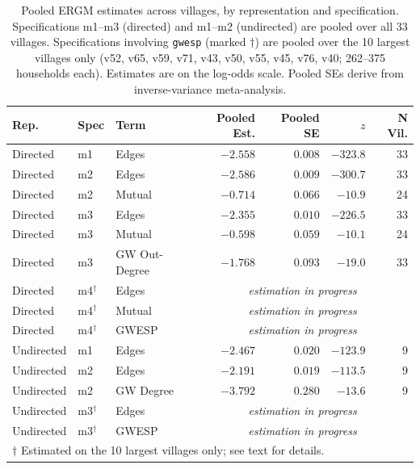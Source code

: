 \documentclass[11pt,a4paper]{article}
\begin{document}
\begin{table}[H]
\centering
\caption{Pooled ERGM estimates across villages, by representation and specification. Specifications m1--m3 (directed) and m1--m2 (undirected) are pooled over all 33 villages. Specifications involving \texttt{gwesp} (marked $\dagger$) are pooled over the 10 largest villages only (v52, v65, v59, v71, v43, v50, v55, v45, v76, v40; 262--375 households each). Estimates are on the log-odds scale. Pooled SEs derive from inverse-variance meta-analysis.}
\label{tab:ergm_pooled}
\begin{tabular}{lllrrrr}
\toprule
Rep. & Spec & Term & Pooled Est. & Pooled SE & $z$ & N Vil. \\
\midrule
Directed & m1 & Edges          & $-2.558$ & $0.008$ & $-323.8$ & 33 \\
Directed & m2 & Edges          & $-2.586$ & $0.009$ & $-300.7$ & 33 \\
Directed & m2 & Mutual         & $-0.714$ & $0.066$ & $-10.9$  & 24 \\
Directed & m3 & Edges          & $-2.355$ & $0.010$ & $-226.5$ & 33 \\
Directed & m3 & Mutual         & $-0.598$ & $0.059$ & $-10.1$  & 24 \\
Directed & m3 & GW Out-Degree  & $-1.768$ & $0.093$ & $-19.0$  & 33 \\
Directed & m4$^\dagger$ & Edges  & \multicolumn{4}{c}{\textit{estimation in progress}} \\
Directed & m4$^\dagger$ & Mutual & \multicolumn{4}{c}{\textit{estimation in progress}} \\
Directed & m4$^\dagger$ & GWESP  & \multicolumn{4}{c}{\textit{estimation in progress}} \\
\midrule
Undirected & m1 & Edges        & $-2.467$ & $0.020$ & $-123.9$ &  9 \\
Undirected & m2 & Edges        & $-2.191$ & $0.019$ & $-113.5$ &  9 \\
Undirected & m2 & GW Degree    & $-3.792$ & $0.280$ & $-13.6$  &  9 \\
Undirected & m3$^\dagger$ & Edges & \multicolumn{4}{c}{\textit{estimation in progress}} \\
Undirected & m3$^\dagger$ & GWESP & \multicolumn{4}{c}{\textit{estimation in progress}} \\
\bottomrule
\multicolumn{7}{l}{\footnotesize $\dagger$ Estimated on the 10 largest villages only; see text for details.}
\end{tabular}
\end{table}
\end{document}
